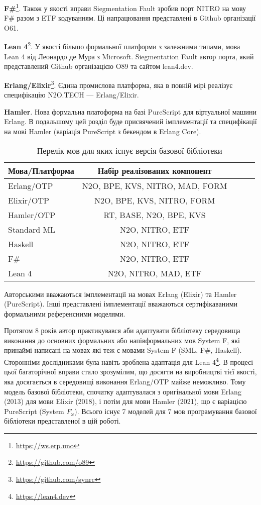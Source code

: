 \textbf{F\#}\footnote{\url{https://ws.erp.uno}}. Також у якості вправи Siegmentation Fault зробив порт NITRO
на мову F# разом з ETF кодуванням. Ці напрацювання представлені в Github
організації O61.

\textbf{Lean 4}\footnote{\url{https://github.com/o89}}. У якості більшо формальної платформи з залежними типами,
мова Lean 4 від Леонардо де Мура з Microsoft. Siegmentation Fault автор порта,
який представлений Github організацією O89 та сайтом lean4.dev.

\textbf{Erlang/Elixir}\footnote{\url{https://github.com/synrc}}. Єдина промислова платформа, яка в повній мірі реалізує
специфікацію N2O.TECH --- Erlang/Elixir.

\textbf{Hamler}. Нова формальна платоформа на базі PureScript для віртуальної машини Erlang.
В подальшому цей розділ буде присвячений імплементації та специфікації
на мові Hamler (варіація PureScript з бекендом в Erlang Core).

\begin{table}[h]
\begin{center}
\caption{Перелік мов для яких існує версія базової бібліотеки}
\begin{tabular}{lcccc}
\hline
\textbf{Мова/Платформа} & \textbf{Набір реалізованих компонент} \\
\hline
Erlang/OTP & N2O, BPE, KVS, NITRO, MAD, FORM \\
Elixir/OTP & N2O, BPE, KVS, NITRO, FORM \\
\hline
Hamler/OTP & RT, BASE, N2O, BPE, KVS \\
\hline
Standard ML & N2O, NITRO, ETF \\
Haskell & N2O, NITRO, ETF \\
F\# & N2O, NITRO, ETF \\
\hline
Lean 4 & N2O, NITRO, MAD, ETF \\
\hline
\end{tabular}
\end{center}
\end{table}

Авторськими вважаються імплементації на мовах Erlang (Elixir) та Hamler (PureScript).
Інші представлені імплементації вважаються сертифікаваними формальними референсними моделями.

Протягом 8 років автор практикувався аби адаптувати бібліотеку середовища виконання
до основних формальних або напівформальних мов System F, які принаймі написані
на мовах які теж є мовами System F (SML, F#, Haskell). Сторонніми дослідниками
була навіть зроблена адаптація для Lean 4\footnote{\url{https://lean4.dev}}.
В процесі цьої багаторічної вправи стало зрозумілим, що досягти на виробництві
тієї якості, яка досягається в середовищі виконання Erlang/OTP майже неможливо.
Тому модель базової бібліотеки, спочатку адаптувалася з оригінальної мови Erlang (2013)
для мови Elixir (2018), і потім для мови Hamler (2021), що є варіацією PureScript (System $F_\omega$).
Всього існує 7 моделей для 7 мов програмування базової бібліотеки представленої в цій роботі.

